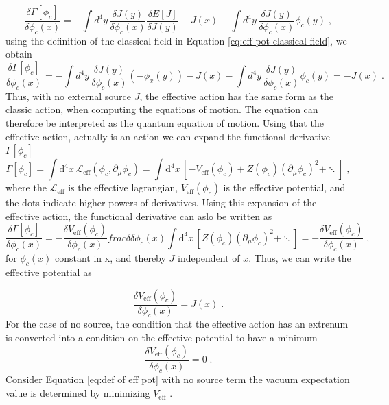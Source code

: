 \begin{equation}
    \frac{\delta \Gamma[\phi_c]}{\delta \phi_c(x)}=- \int d^4y\, \frac{\delta J(y)}{\delta \phi_c(x)} \frac{\delta E[J]}{\delta J(y)} - J(x) - \int d^4y\,  \frac{\delta J(y)}{\delta \phi_c(x)}\phi_c(y)\;,
\end{equation}
using the definition of the classical field in Equation \ref{eq:eff pot classical field}, we obtain
\begin{equation}
    \frac{\delta \Gamma[\phi_c]}{\delta \phi_c(x)}=- \int d^4y\, \frac{\delta J(y)}{\delta \phi_c(x)}(-\phi_x(y)) - J(x) - \int d^4y\,  \frac{\delta J(y)}{\delta \phi_c(x)}\phi_c(y)=- J(x)\;.
\end{equation}
Thus, with no external source $J$, the effective action has the same form as the classic action, when computing the equations of motion. The equation can therefore be interpreted as the quantum equation of motion. Using that the effective action, actually is an action we can expand the functional derivative $\Gamma[\phi_c]$
\begin{equation}
    \Gamma[\phi_c] = \int \text{d}^4 x\, \mathcal{L}_{\text{eff}}(\phi_c,\partial_\mu\phi_c)= \int \text{d}^4 x\, \left[-V_{\text{eff}}(\phi_c) + Z(\phi_c)(\partial_\mu \phi_c)^2 + \ddots \right]\;,
\end{equation}
where the $\mathcal{L}_{\text{eff}}$ is the effective lagrangian, $V_{\text{eff}}(\phi_c) $ is the effective potential, and the dots indicate higher powers of derivatives. Using this expansion of the effective action, the functional derivative can aslo be written as
\begin{equation}
    \frac{\delta \Gamma[\phi_c]}{\delta \phi_c(x)}=- \frac{\delta V_{\text{eff}}(\phi_c) }{\delta \phi_c(x)} frac{\delta }{\delta \phi_c(x)}\int \text{d}^4 x\, \left[ Z(\phi_c)(\partial_\mu \phi_c)^2 + \ddots \right]=- \frac{\delta V_{\text{eff}}(\phi_c) }{\delta \phi_c(x)} \;,
\end{equation}
for $\phi_c(x)$ constant in x, and thereby $J$ independent of $x$. Thus, we can write the effective potential as

\begin{equation}
    \frac{\delta V_{\text{eff}}(\phi_c) }{\delta \phi_c(x)} = J(x) \;.
\end{equation}
For the case of no source, the condition that the effective action has an extrenum is converted into a condition on the effective potential to have a minimum 
\begin{equation}
    \frac{\delta V_{\text{eff}}(\phi_c) }{\delta \phi_c(x)} = 0 \;.
\end{equation}
Consider Equation \ref{eq:def of eff pot} with no source term the vacuum expectation value is determined by minimizing $V_{\text{eff}}$ \cite{zee}.
